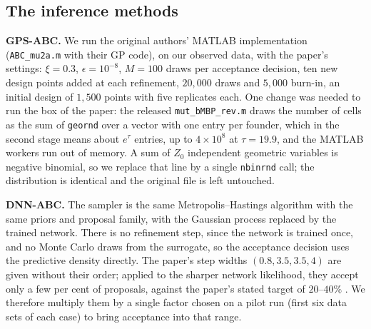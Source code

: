 \documentclass[sn-basic,iicol,pdflatex]{sn-jnl}
\begin{document}
\subsection{The inference methods}
\label{sec:methods2}

\noindent\textbf{GPS-ABC.} We run the original authors' MATLAB implementation
(\texttt{ABC\_mu2a.m} with their GP code), on our observed data, with
the paper's settings: $\xi=0.3$, $\epsilon=10^{-8}$, $M=100$ draws per
acceptance decision, ten new design points added at each refinement, $20{,}000$
draws and $5{,}000$ burn-in, an initial design of $1{,}500$ points with five
replicates each. One change was needed to run the box of the paper:
the released \texttt{mut\_bMBP\_rev.m} draws the number of cells as the sum of
\texttt{geornd} over a vector with one entry per founder, which in the second
stage means about $e^{\tau}$ entries, up to $4\times10^{8}$ at $\tau=19.9$, and
the MATLAB workers run out of memory. A sum of $Z_0$ independent geometric
variables is negative binomial, so we replace that line by a single
\texttt{nbinrnd} call; the distribution is identical and the original file is
left untouched.

\noindent\textbf{DNN-ABC.} The sampler is the same Metropolis--Hastings algorithm
with the same priors and proposal family, with the Gaussian process replaced by
the trained network. There is no refinement step, since the network is trained
once, and no Monte Carlo draws from the surrogate, so the acceptance
decision uses the predictive density directly. The paper's step widths
$(0.8,3.5,3.5,4)$ are given without their order; applied to the sharper
network likelihood, they accept only a few per cent of proposals, against the
paper's stated target of $20$--$40\%$ \citep{roberts2001}. We therefore multiply them by a single
factor chosen on a pilot run (first six data sets of each case) to bring
acceptance into that range.
\end{document}
